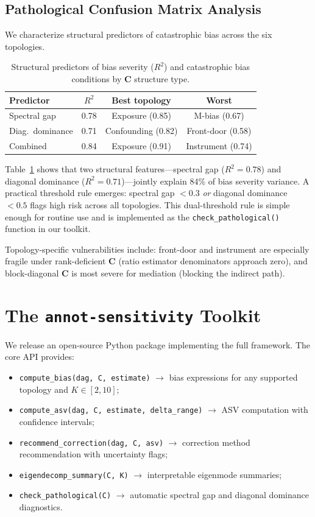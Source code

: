 \documentclass[11pt,letterpaper]{article}
\begin{document}
\subsection{Pathological Confusion Matrix Analysis}

We characterize structural predictors of catastrophic bias across the six topologies.

\begin{table}[t]
\centering
\small
\caption{Structural predictors of bias severity ($R^2$) and catastrophic bias conditions by $\mathbf{C}$ structure type.}
\label{tab:pathological}
\begin{tabular}{@{}lccc@{}}
\toprule
\textbf{Predictor} & $R^2$ & \textbf{Best topology} & \textbf{Worst} \\
\midrule
Spectral gap & 0.78 & Exposure (0.85) & M-bias (0.67) \\
Diag.\ dominance & 0.71 & Confounding (0.82) & Front-door (0.58) \\
Combined & 0.84 & Exposure (0.91) & Instrument (0.74) \\
\bottomrule
\end{tabular}
\end{table}

Table~\ref{tab:pathological} shows that two structural features---spectral gap ($R^2 = 0.78$) and diagonal dominance ($R^2 = 0.71$)---jointly explain 84\% of bias severity variance.
A practical threshold rule emerges: spectral gap $< 0.3$ \emph{or} diagonal dominance $< 0.5$ flags high risk across all topologies.
This dual-threshold rule is simple enough for routine use and is implemented as the \texttt{check\_pathological()} function in our toolkit.

Topology-specific vulnerabilities include: front-door and instrument are especially fragile under rank-deficient $\mathbf{C}$ (ratio estimator denominators approach zero), and block-diagonal $\mathbf{C}$ is most severe for mediation (blocking the indirect path).

\section{The \texttt{annot-sensitivity} Toolkit}

We release an open-source Python package implementing the full framework.
The core API provides:

\begin{itemize}[nosep,leftmargin=*]
\item \texttt{compute\_bias(dag, C, estimate)} $\to$ bias expressions for any supported topology and $K \in [2, 10]$;
\item \texttt{compute\_asv(dag, C, estimate, delta\_range)} $\to$ ASV computation with confidence intervals;
\item \texttt{recommend\_correction(dag, C, asv)} $\to$ correction method recommendation with uncertainty flags;
\item \texttt{eigendecomp\_summary(C, K)} $\to$ interpretable eigenmode summaries;
\item \texttt{check\_pathological(C)} $\to$ automatic spectral gap and diagonal dominance diagnostics.
\end{itemize}
\end{document}
